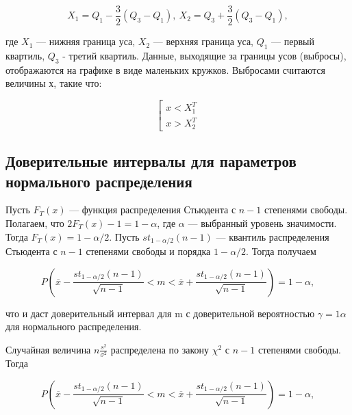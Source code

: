 \documentclass[12pt,a4paper]{article}
\begin{document}
	\begin{equation} \label{eq:box_plot}
		X_1 = Q_1 - \frac{3}{2}(Q_3 - Q_1), \ X_2 = Q_3 + \frac{3}{2}(Q_3 - Q_1),
	\end{equation}

	где \( X_1 \) — нижняя граница уса, \( X_2 \) — верхняя граница уса,
	\( Q_1 \) — первый квартиль, \( Q_3 \) - третий квартиль. Данные,
	выходящие за границы усов (выбросы), отображаются на графике в виде
	маленьких кружков. Выбросами считаются величины \( х \), такие что:

	\begin{equation} \label{eq:outlier}
		\left[
			\begin{array}{ll}
					x < X_1^T \\
					x > X_2^T
			\end{array}
		\right .
	\end{equation}

	\subsection{Доверительные интервалы для параметров нормального
		распределения}

	Пусть \( F_T(x) \) — функция распределения Стьюдента с \( n - 1 \)
	степенями свободы. Полагаем, что \( 2F_T(x) - 1 = 1 - \alpha \), где
	\( \alpha \) — выбранный уровень значимости. Тогда
	\( F_T(x) = 1 - \alpha / 2 \). Пусть \( st_{1 - \alpha / 2}(n - 1) \) —
	квантиль распределения Стьюдента с \( n - 1 \) степенями свободы и
	порядка \( 1 - \alpha / 2 \). Тогда получаем

	\begin{equation} \label{eq:normal_mean_boundaries}
		P \left ( \overline x - \frac{st_{1 - \alpha / 2}(n - 1)}{\sqrt{n - 1}} < m
		< \overline x + \frac{st_{1 - \alpha / 2}(n - 1)}{\sqrt{n - 1}} \right ) =
		1 - \alpha,
	\end{equation}

	что и даст доверительный интервал для m с доверительной вероятностью
	\( \gamma = 1 \alpha \) для нормального распределения.

	Случайная величина \( n \frac{s^2}{\sigma^2} \) распределена по закону
	\( \chi^2 \) с \( n - 1 \) степенями свободы. Тогда

	\begin{equation} \label{eq:mean_boundaries}
		P \left ( \overline x - \frac{st_{1 - \alpha / 2}(n - 1)}{\sqrt{n - 1}} <
		m < \overline x + \frac{st_{1 - \alpha / 2}(n - 1)}{\sqrt{n - 1}} \right )
		= 1 - \alpha,
	\end{equation}
\end{document}
